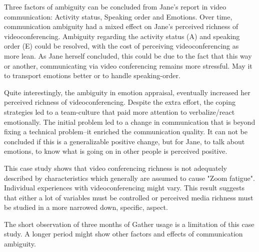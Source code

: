 \documentclass[man]{apa7}
\begin{document}
Three factors of ambiguity can be concluded from Jane's report in video communication: Activity status, Speaking order and Emotions. Over time, communication ambiguity had a mixed effect on Jane's perceived richness of videoconferencing. Ambiguity regarding the activity status (A) and speaking order (E) could be resolved, with the cost of perceiving videoconferencing as more lean. As Jane herself concluded, this could be due to the fact that this way or another, communicating via video conferencing remains more stressful. May it to transport emotions better or to handle speaking-order.

Quite interestingly, the ambiguity in emotion appraisal, eventually increased her perceived richness of videoconferencing. Despite the extra effort, the coping strategies led to a team-culture that paid more attention to verbalize/react emotionally. The initial problem led to a change in communication that is beyond fixing a technical problem–it enriched the communication quality. It can not be concluded if this is a generalizable positive change, but for Jane, to talk about emotions, to know what is going on in other people is perceived positive.

This case study shows that video conferencing richness is not adequately described by characteristics which generally are assumed to cause "Zoom fatigue". Individual experiences with videoconferencing might vary. This result suggests that either a lot of variables must be controlled or perceived media richness must be studied in a more narrowed down, specific, aspect.

The short observation of three months of Gather usage is a limitation of this case study. A longer period might show other factors and effects of communication ambiguity.

\printbibliography
\end{document}
